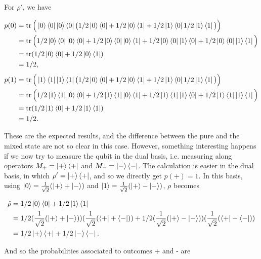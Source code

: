 \noindent For $\rho'$, we have

\begin{align}
    p(0) &= \operatorname{tr}\Big(\ket{0}\bra{0}\ket{0}\bra{0}\big(1/2 \ket{0}\bra{0} + 1/2 \ket{0}\bra{1} + 1/2 \ket{1}\bra{0} 1/2 \ket{1}\bra{1}\big)\Big)\\
         &= \operatorname{tr}\Big(1/2 \ket{0}\bra{0}\ket{0}\bra{0} +1/2 \ket{0}\bra{0}\ket{0}\bra{1} + 1/2 \ket{0}\bra{0}\ket{1}\bra{0} + 1/2 \ket{0}\bra{0}\ket{1}\bra{1}\Big)\\
         &= \operatorname{tr}(1/2 \ket{0}\bra{0} + 1/2 \ket{0}\bra{1})\\
         &= 1/2,
\end{align}
\begin{align}
    p(1) &= \operatorname{tr}\Big(\ket{1}\bra{1}\ket{1}\bra{1}\big(1/2 \ket{0}\bra{0} + 1/2 \ket{0}\bra{1} + 1/2 \ket{1}\bra{0} 1/2 \ket{1}\bra{1}\big)\Big)\\
         &= \operatorname{tr}\Big(1/2 \ket{1}\bra{1}\ket{0}\bra{0} +1/2 \ket{1}\bra{1}\ket{0}\bra{1} + 1/2 \ket{1}\bra{1}\ket{1}\bra{0} + 1/2 \ket{1}\bra{1}\ket{1}\bra{1}\Big)\\
         &= \operatorname{tr}(1/2 \ket{1}\bra{0} + 1/2 \ket{1}\bra{1})\\
         &= 1/2.
\end{align}

These are the expected results, and the difference between the pure and the mixed state are not so clear in this case. However, something interesting happens if we now try to measure the qubit in the dual basis, i.e. measuring along operators $M_+ = \ket{+}\bra{+}$ and $M_- = \ket{-}\bra{-}$. The calculation is easier in the dual basis, in which $\rho' = \ket{+}\bra{+}$, and so we directly get $p(+) = 1$. In this basis, using $\ket{0} = \frac{1}{\sqrt{2}}(\ket{+} + \ket{-})$ and $\ket{1} = \frac{1}{\sqrt{2}}(\ket{+} - \ket{-})$, $\rho$ becomes

\begin{align}
    \hat{\rho} &= 1/2 \ket{0}\bra{0} + 1/2 \ket{1}\bra{1}\\
               &= 1/2 (\frac{1}{\sqrt{2}}(\ket{+} + \ket{-}))(\frac{1}{\sqrt{2}}(\bra{+} + \bra{-})) + 1/2 (\frac{1}{\sqrt{2}}(\ket{+} - \ket{-}))(\frac{1}{\sqrt{2}}(\bra{+} - \bra{-}))\\
               &= 1/2 \ket{+}\bra{+} + 1/2 \ket{-}\bra{-}.
\end{align}

\noindent And so the probabilities associated to outcomes + and - are

